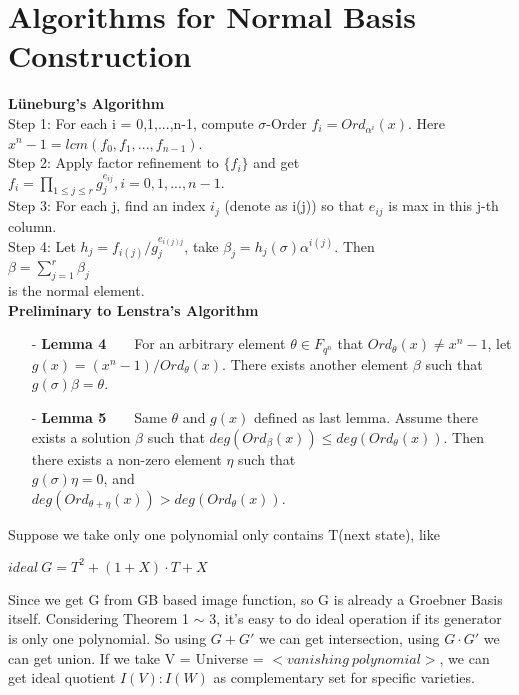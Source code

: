 \documentclass[12pt]{article}
\begin{document}
\section{Algorithms for Normal Basis Construction}
\textbf{L\"uneburg's Algorithm}\\
Step 1: For each i = 0,1,...,n-1, compute $\sigma$-Order $f_i = Ord_{\alpha^i}(x)$. Here $x^n - 1 = lcm(f_0,f_1,...,f_{n-1})$.\\
Step 2: Apply factor refinement to $\{f_i\}$ and get $f_i = \prod_{1\leq j\leq r} g_{j}^{e_{ij}}, i = 0,1,...,n-1$.\\
Step 3: For each j, find an index $i_j$ (denote as i(j)) so that $e_{ij}$ is max in this j-th column.\\
Step 4: Let $h_j = f_{i(j)}/g_{j}^{e_{i(j)j}}$, take $\beta_j = h_j(\sigma)\alpha^{i(j)}$. Then\\
\indent\indent\indent\indent\indent\indent\indent\indent\indent$\beta = \displaystyle\sum_{j=1}^{r} \beta_j$\\
is the normal element.\\

\textbf{Preliminary to Lenstra's Algorithm}
\begin{itemize}
\item[-] \textbf{Lemma 4}\ \ \ \ For an arbitrary element $\theta \in F_{q^n}$ that $Ord_\theta(x) \neq x^n - 1$,
let $g(x) = (x^n - 1)/Ord_\theta(x)$. There exists another element $\beta$ such that $g(\sigma)\beta = \theta$.\
\item[-] \textbf{Lemma 5}\ \ \ \ Same $\theta$ and $g(x)$ defined as last lemma. Assume there exists a solution 
$\beta$ such that $deg(Ord_\beta(x)) \leq deg(Ord_\theta(x))$. Then there exists a non-zero element $\eta$ such that\\
$g(\sigma)\eta = 0$, and\\
$deg(Ord_{\theta+\eta}(x)) > deg(Ord_\theta(x))$.

\end{itemize} 








Suppose we take only one polynomial only contains T(next state), like\\
\hspace{8mm}\par
$ideal\ G = T^2 + (1+X) \cdot T + X$\\
\hspace{8mm}\par
Since we get G from GB based image function, so G is already a Groebner Basis itself.
Considering Theorem 1 $\sim$ 3, it's easy to do ideal operation if its generator is only one polynomial.
So using $G+G'$ we can get intersection, using $G \cdot G'$ we can get union. If we take V = Universe = $<vanishing\ polynomial>$, we can get ideal quotient $I(V):I(W)$ as complementary set for
specific varieties.
\end{document}

